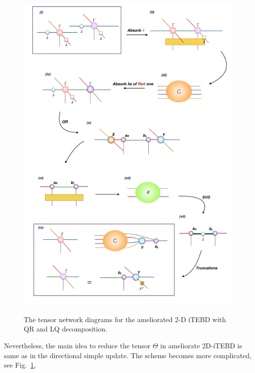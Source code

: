 \begin{figure}[!ht]
	\centering
	\includegraphics[width=1.00\textwidth]{figures/fig319.png}
	\includegraphics[width=1.00\textwidth]{figures/fig320.png}
	\caption[The tensor network diagrams for the ameliorated 2-D iTEBD with QR and LQ decomposition]{The tensor network diagrams for the ameliorated 2-D iTEBD with QR and LQ decomposition.}
	\label{fig320}
\end{figure}

Nevertheless, the main idea to reduce the tensor $\Theta$ in ameliorate 2D-iTEBD is same as in the directional simple update. The scheme becomes more complicated, see Fig.~\ref{fig320}, 

